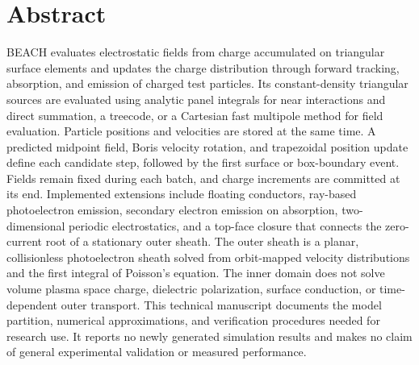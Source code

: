 \documentclass[11pt,a4paper,oneside,openany]{book}
\begin{document}
\section*{Abstract}
BEACH evaluates electrostatic fields from charge accumulated on triangular surface elements and updates
the charge distribution through forward tracking, absorption, and emission of charged test particles.
Its constant-density triangular sources are evaluated using analytic panel integrals for near interactions
and direct summation, a treecode, or a Cartesian fast multipole method for field evaluation.
Particle positions and velocities are stored at the same time. A predicted midpoint field, Boris velocity
rotation, and trapezoidal position update define each candidate step, followed by the first surface or
box-boundary event. Fields remain fixed during each batch, and charge increments are committed at its end.
Implemented extensions include floating conductors, ray-based photoelectron emission, secondary electron emission on absorption,
two-dimensional periodic electrostatics, and a top-face closure that connects the zero-current root of a stationary outer sheath.
The outer sheath is a planar, collisionless photoelectron sheath solved from orbit-mapped velocity distributions
and the first integral of Poisson's equation.
The inner domain does not solve volume plasma space charge, dielectric polarization, surface conduction,
or time-dependent outer transport. This technical manuscript documents the model partition, numerical
approximations, and verification procedures needed for research use. It reports no newly generated
simulation results and makes no claim of general experimental validation or measured performance.

\tableofcontents
\listoffigures
\mainmatter










\backmatter


\end{document}
